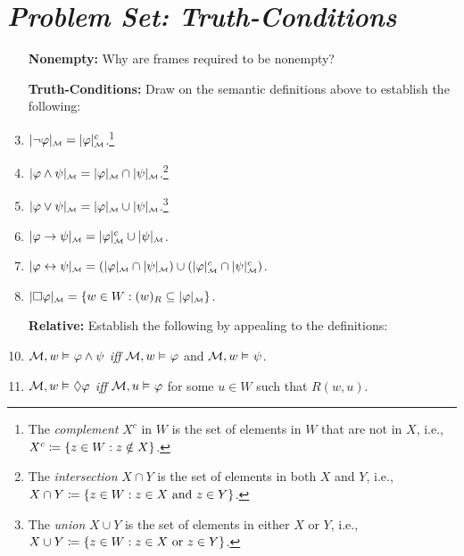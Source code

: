 \documentclass[a4paper, 11pt]{article} %
\begin{document}
\section*{\it Problem Set: Truth-Conditions}

\begin{enumerate}[leftmargin=1.2in,itemsep=1pt]\small
	\item[\bf Nonempty:] Why are frames required to be nonempty?
	\item[\bf Truth-Conditions:] Draw on the semantic definitions above to establish the following:
    \item $\interpret{\M}{\neg \metaA} = \interpret{\M}{\metaA}^c$.\footnote{The \textit{complement} $X^c$ in $W$ is the set of elements in $W$ that are not in $X$, i.e., $X^c \coloneq \set{z \in W : z \notin X}$.}
    \item $\interpret{\M}{\metaA \wedge \metaB} = \interpret{\M}{\metaA} \cap \interpret{\M}{\metaB}$.\footnote{The \textit{intersection} $X\cap Y$ is the set of elements in both $X$ and $Y$, i.e., $X \cap Y \coloneq \set{z \in W : z \in X ~\text{and}~ z \in Y}$.}
    \item $\interpret{\M}{\metaA \vee \metaB} = \interpret{\M}{\metaA} \cup \interpret{\M}{\metaB}$.\footnote{The \textit{union} $X \cup Y$ is the set of elements in either $X$ or $Y$, i.e., $X \cup Y \coloneq \set{z \in W : z \in X ~\text{or}~ z \in Y}$.}
    \item $\interpret{\M}{\metaA \rightarrow \metaB} = \interpret{\M}{\metaA}^c \cup \interpret{\M}{\metaB}$.
    \item $\interpret{\M}{\metaA \leftrightarrow \metaB} = (\interpret{\M}{\metaA} \cap \interpret{\M}{\metaB}) \cup (\interpret{\M}{\metaA}^c \cap \interpret{\M}{\metaB}^c)$.
    \item $\interpret{\M}{\Box \metaA} = \set{w \in W : (w)_R \subseteq \interpret{\M}{\metaA}}$.
	\item[\bf Relative:] Establish the following by appealing to the definitions:
    \item $\M, w \MLmodels[] \metaA \wedge \metaB$ \textit{iff} $\M, w \MLmodels \metaA$ and $\M, w \MLmodels \metaB$.
    \item $\M, w \MLmodels[] \Diamond\metaA$ \textit{iff} $\M, u \MLmodels \metaA$ for some $u \in W$ such that $R(w, u)$.

\end{enumerate}
\end{document}
